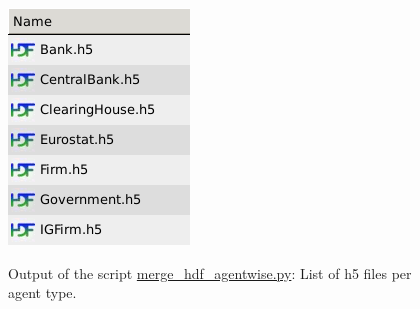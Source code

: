 \documentclass[10pt,a4paper]{article}
\begin{document}
\begin{figure}[htb!]
\centering\leavevmode
\graphicspath{{./hdf5_snapshots/}}
%
\centering\leavevmode
\includegraphics[scale=.4]{Fig_4_list_of_hdf5_files_separated-per-agent-type.png} 
\label{Fig: h5 per agent list}
\caption{\footnotesize  Output of the script \url{merge_hdf_agentwise.py}: List of h5 files per agent type.}
\end{figure}
\end{document}
